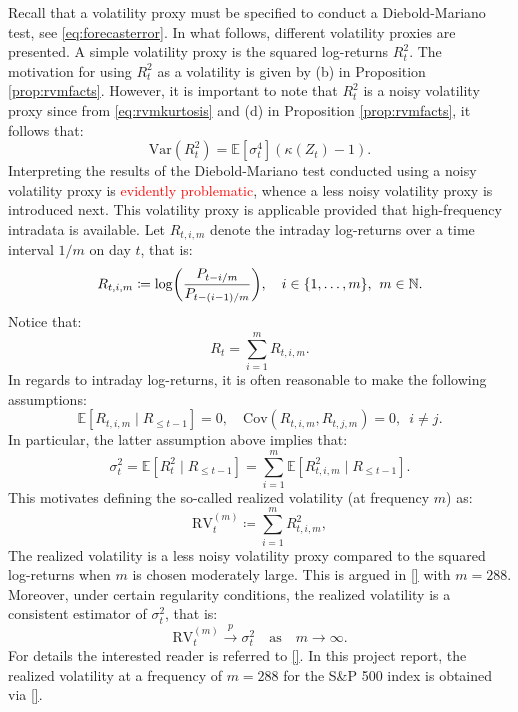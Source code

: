 Recall that a volatility proxy must be specified to conduct a Diebold-Mariano test, see \eqref{eq:forecasterror}. In what follows, different volatility proxies are presented. A simple volatility proxy is the squared log-returns $R_{t}^{2}$. The motivation for using $R_{t}^{2}$ as a volatility is given by (b) in Proposition \ref{prop:rvmfacts}. However, it is important to note that $R_{t}^{2}$ is a noisy volatility proxy since from \eqref{eq:rvmkurtosis} and (d) in Proposition \ref{prop:rvmfacts}, it follows that:
\begin{equation*}
    \mathrm{Var}(R_{t}^{2})=\mathbb{E}[\sigma_{t}^{4}]\left(\kappa(Z_{t})-1\right).
\end{equation*}
Interpreting the results of the Diebold-Mariano test conducted using a noisy volatility proxy is \textcolor{red}{evidently problematic}, whence a less noisy volatility proxy is introduced next. This volatility proxy is applicable provided that high-frequency intradata is available. Let $R_{t,i,m}$ denote the intraday log-returns over a time interval $1/m$ on day $t$, that is:
\begin{equation*}
    R_{t,i,m}\coloneqq\log\left(\frac{P_{t-i/m}}{P_{t-(i-1)/m}}\right),\quad i\in\{1,\dots,m\},\hspace{4pt}m\in\N.
\end{equation*}
Notice that:
\begin{equation*}
    R_{t}=\sum_{i=1}^{m}R_{t,i,m}.
\end{equation*}
In regards to intraday log-returns, it is often reasonable to make the following assumptions:
\begin{equation*}
    \mathbb{E}[R_{t,i,m}\mid R_{\leq t-1}]=0,\quad\mathrm{Cov}(R_{t,i,m},R_{t,j,m})=0,\hspace{6pt} i\neq j.
\end{equation*}
In particular, the latter assumption above implies that:
\begin{equation*}
    \sigma_{t}^{2}=\mathbb{E}[R_{t}^{2}\mid R_{\leq t-1}]%
    =\sum_{i=1}^{m}\mathbb{E}[R_{t,i,m}^{2}\mid R_{\leq t-1}].
\end{equation*}
This motivates defining the so-called realized volatility (at frequency $m$) as:
\begin{equation}
    \mathrm{RV}_{t}^{(m)}\coloneqq\sum_{i=1}^{m}R_{t,i,m}^{2},
\end{equation}
The realized volatility is a less noisy volatility proxy compared to the squared log-returns when $m$ is chosen moderately large. This is argued in \ref{} with $m=288$. %
Moreover, under certain regularity conditions, the realized volatility is a consistent estimator of $\sigma_{t}^{2}$, that is:
\begin{equation*}
    \mathrm{RV}_{t}^{(m)}\overset{p}{\to}\sigma_{t}^{2}\quad\textrm{as}\quad m\to\infty.
\end{equation*}
For details the interested reader is referred to \ref{}. %
In this project report, the realized volatility at a frequency of $m=288$ for the S\&P 500 index is obtained via \ref{}. %

